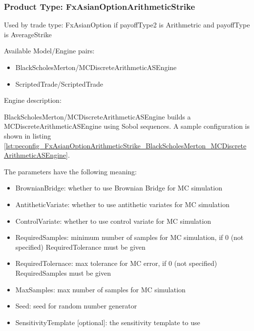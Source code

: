 \subsubsection{Product Type: FxAsianOptionArithmeticStrike}

Used by trade type: FxAsianOption if payoffType2 is Arithmetric and payoffType is AverageStrike

Available Model/Engine pairs:

\begin{itemize}
\item BlackScholesMerton/MCDiscreteArithmeticASEngine
\item ScriptedTrade/ScriptedTrade
\end{itemize}
  
Engine description:

BlackScholesMerton/MCDiscreteArithmeticASEngine builds a MCDiscreteArithmeticASEngine using Sobol sequences. A sample
configuration is shown in listing
\ref{lst:peconfig_FxAsianOptionArithmeticStrike_BlackScholesMerton_MCDiscreteArithmeticASEngine}.

The parameters have the following meaning:

\begin{itemize}
\item BrownianBridge: whether to use Brownian Bridge for MC simulation
\item AntitheticVariate: whether to use antithetic variates for MC simulation
\item ControlVariate: whether to use control variate for MC simulation
\item RequiredSamples: minimum number of samples for MC simulation, if 0 (not specified) RequiredTolerance must be given
\item RequiredTolernace: max tolerance for MC error, if 0 (not specified) RequiredSamples must be given
\item MaxSamples: max number of samples for MC simulation
\item Seed: seed for random number generator
\item SensitivityTemplate [optional]: the sensitivity template to use 
\end{itemize}

